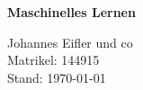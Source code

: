 \documentclass[a4paper, 12pt]{scrartcl}
\begin{document}
\begin{normalsize}

\raggedright\textbf{\Huge Maschinelles Lernen}\\	
		\begin{flushright}
		Johannes Eifler und co\\
		Matrikel: 144915\\
		Stand: \space \today \space \thistime
		\end{flushright}

\end{normalsize}




\end{document}
